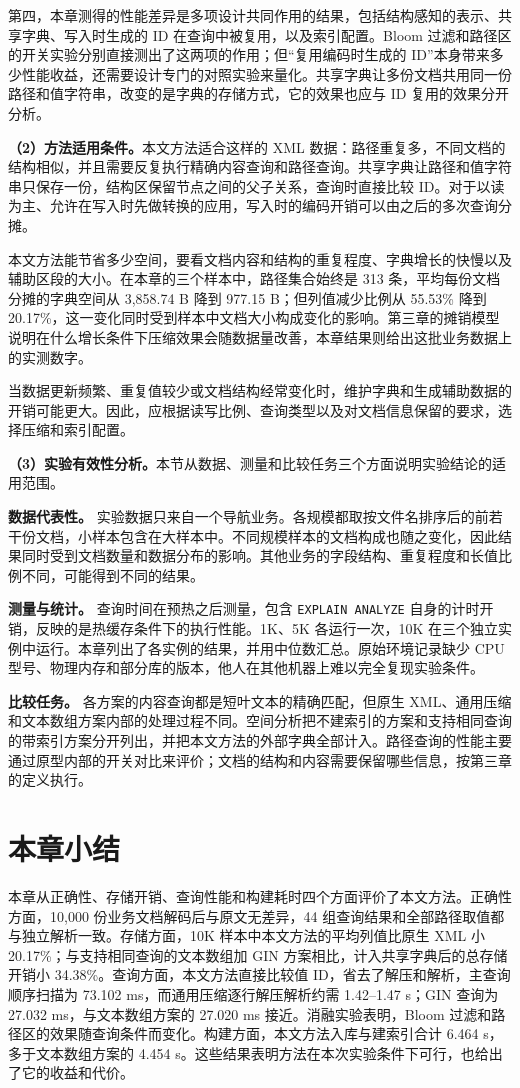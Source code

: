 第四，本章测得的性能差异是多项设计共同作用的结果，包括结构感知的表示、共享字典、写入时生成的 ID 在查询中被复用，以及索引配置。Bloom 过滤和路径区的开关实验分别直接测出了这两项的作用；但“复用编码时生成的 ID”本身带来多少性能收益，还需要设计专门的对照实验来量化。共享字典让多份文档共用同一份路径和值字符串，改变的是字典的存储方式，它的效果也应与 ID 复用的效果分开分析。

\textbf{（2）方法适用条件。}本文方法适合这样的 XML 数据：路径重复多，不同文档的结构相似，并且需要反复执行精确内容查询和路径查询。共享字典让路径和值字符串只保存一份，结构区保留节点之间的父子关系，查询时直接比较 ID。对于以读为主、允许在写入时先做转换的应用，写入时的编码开销可以由之后的多次查询分摊。

本文方法能节省多少空间，要看文档内容和结构的重复程度、字典增长的快慢以及辅助区段的大小。在本章的三个样本中，路径集合始终是 313 条，平均每份文档分摊的字典空间从 3,858.74 B 降到 977.15 B；但列值减少比例从 55.53\% 降到 20.17\%，这一变化同时受到样本中文档大小构成变化的影响。第三章的摊销模型说明在什么增长条件下压缩效果会随数据量改善，本章结果则给出这批业务数据上的实测数字。

当数据更新频繁、重复值较少或文档结构经常变化时，维护字典和生成辅助数据的开销可能更大。因此，应根据读写比例、查询类型以及对文档信息保留的要求，选择压缩和索引配置。

\textbf{（3）实验有效性分析。}本节从数据、测量和比较任务三个方面说明实验结论的适用范围。

\textbf{数据代表性。} 实验数据只来自一个导航业务。各规模都取按文件名排序后的前若干份文档，小样本包含在大样本中。不同规模样本的文档构成也随之变化，因此结果同时受到文档数量和数据分布的影响。其他业务的字段结构、重复程度和长值比例不同，可能得到不同的结果。

\textbf{测量与统计。} 查询时间在预热之后测量，包含 \texttt{EXPLAIN ANALYZE} 自身的计时开销，反映的是热缓存条件下的执行性能。1K、5K 各运行一次，10K 在三个独立实例中运行。本章列出了各实例的结果，并用中位数汇总。原始环境记录缺少 CPU 型号、物理内存和部分库的版本，他人在其他机器上难以完全复现实验条件。

\textbf{比较任务。} 各方案的内容查询都是短叶文本的精确匹配，但原生 XML、通用压缩和文本数组方案内部的处理过程不同。空间分析把不建索引的方案和支持相同查询的带索引方案分开列出，并把本文方法的外部字典全部计入。路径查询的性能主要通过原型内部的开关对比来评价；文档的结构和内容需要保留哪些信息，按第三章的定义执行。

\section{本章小结}

本章从正确性、存储开销、查询性能和构建耗时四个方面评价了本文方法。正确性方面，10,000 份业务文档解码后与原文无差异，44 组查询结果和全部路径取值都与独立解析一致。存储方面，10K 样本中本文方法的平均列值比原生 XML 小 20.17\%；与支持相同查询的文本数组加 GIN 方案相比，计入共享字典后的总存储开销小 34.38\%。查询方面，本文方法直接比较值 ID，省去了解压和解析，主查询顺序扫描为 73.102 ms，而通用压缩逐行解压解析约需 1.42--1.47 s；GIN 查询为 27.032 ms，与文本数组方案的 27.020 ms 接近。消融实验表明，Bloom 过滤和路径区的效果随查询条件而变化。构建方面，本文方法入库与建索引合计 6.464 s，多于文本数组方案的 4.454 s。这些结果表明方法在本次实验条件下可行，也给出了它的收益和代价。
